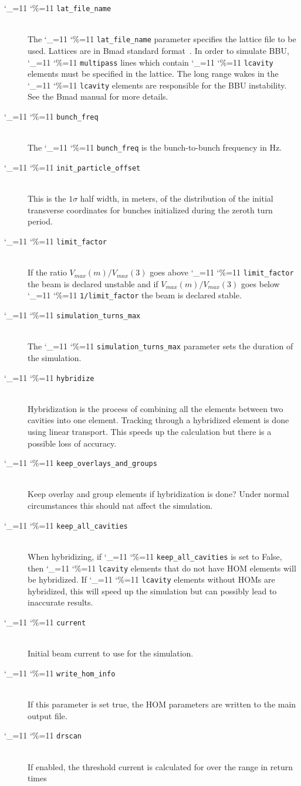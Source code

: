 \documentclass[11pt]{article}
\newcommand\ttcmd{\begingroup\catcode`\_=11 \catcode`\%=11 \dottcmd}
\newcommand\dottcmd[1]{\texttt{#1}\endgroup}
\newcommand{\vn}{\ttcmd}
\newcommand{\Newline}{\hfil \\}
\begin{document}
{  \begin{description}
  \item[\vn{lat_file_name}] \Newline
The \vn{lat_file_name} parameter specifies the lattice file to be
used.  Lattices are in Bmad standard format~\cite{ref:bmad}. In order
to simulate BBU, \vn{multipass} lines which contain \vn{lcavity}
elements must be specified in the lattice. The long range wakes in the
\vn{lcavity} elements are responsible for the BBU instability. See
the Bmad manual for more details.
  \item[\vn{bunch_freq}] \Newline
The \vn{bunch_freq} is the bunch-to-bunch frequency in Hz.
  \item[\vn{init_particle_offset}] \Newline
This is the $1\sigma$ half width, in meters, of the distribution of
the initial transverse coordinates for bunches initialized during the
zeroth turn period.
  \item[\vn{limit_factor}] \Newline
If the ratio $V_{max}(m)/V_{max}(3)$ goes above \vn{limit_factor} the
beam is declared unstable and if $V_{max}(m)/V_{max}(3)$ goes below
\vn{1/limit_factor} the beam is declared stable.
  \item[\vn{simulation_turns_max}] \Newline
The \vn{simulation_turns_max} parameter sets the duration of the simulation.
  \item[\vn{hybridize}] \Newline
Hybridization is the process of combining all the elements between
two cavities into one element. Tracking through a hybridized element
is done using linear transport. This speeds up the calculation but
there is a possible loss of accuracy.
  \item[\vn{keep_overlays_and_groups}] \Newline
Keep overlay and group elements if hybridization is done? Under normal circumstances this should nat affect the simulation.
  \item[\vn{keep_all_cavities}] \Newline
When hybridizing, if \vn{keep_all_cavities} is set to False, then
\vn{lcavity} elements that do not have HOM elements will be
hybridized. If \vn{lcavity} elements without HOMs are hybridized, this
will speed up the simulation but can possibly lead to inaccurate
results.
  \item[\vn{current}] \Newline
Initial beam current to use for the simulation.
  \item[\vn{write_hom_info}] \Newline
If this parameter is set true, the HOM parameters are written to the
main output file.
  \item[\vn{drscan}] \Newline
If enabled, the threshold current is calculated for over the range in return times

\end{description}}
\end{document}
